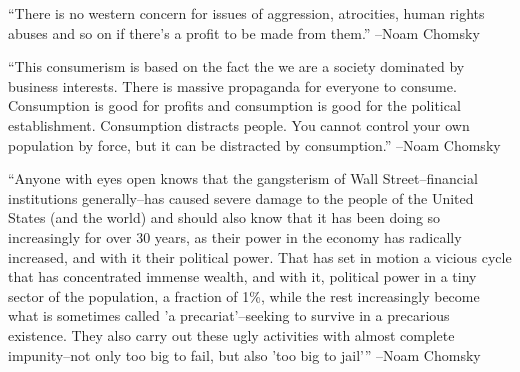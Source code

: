 \documentclass{article}%
\begin{document}
\linebreak%
\vspace{1mm}%
\begin{minipage}{\textwidth}%
\flushleft%
“There is no western concern for issues of aggression, atrocities, human rights abuses and so on if there's a profit to be made from them.”%
\linebreak%
\vspace{1mm}%
–Noam Chomsky%
\linebreak%
\vspace{1mm}%
\end{minipage}%
\linebreak%
\vspace{1mm}%
\begin{minipage}{\textwidth}%
\flushleft%
“This consumerism is based on the fact the we are a society dominated by business interests. There is massive propaganda for everyone to consume. Consumption is good for profits and consumption is good for the political establishment. Consumption distracts people. You cannot control your own population by force, but it can be distracted by consumption.”%
\linebreak%
\vspace{1mm}%
–Noam Chomsky%
\linebreak%
\vspace{1mm}%
\end{minipage}%
\linebreak%
\vspace{1mm}%
\begin{minipage}{\textwidth}%
\flushleft%
“Anyone with eyes open knows that the gangsterism of Wall Street–financial institutions generally–has caused severe damage to the people of the United States (and the world) and should also know that it has been doing so increasingly for over 30 years, as their power in the economy has radically increased, and with it their political power. That has set in motion a vicious cycle that has concentrated immense wealth, and with it, political power in a tiny sector of the population, a fraction of 1\%, while the rest increasingly become what is sometimes called ’a precariat’–seeking to survive in a precarious existence. They also carry out these ugly activities with almost complete impunity–not only too big to fail, but also ’too big to jail’”%
\linebreak%
\vspace{1mm}%
–Noam Chomsky%
\linebreak%
\vspace{1mm}%
\end{minipage}%
\end{document}
